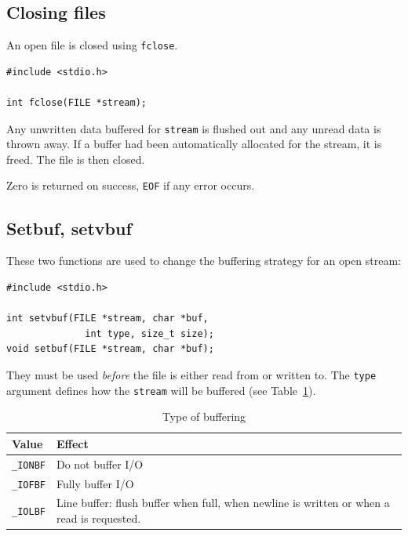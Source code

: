   

  \subsection{Closing files}
   

   An open file is closed using \texttt{fclose}.


   \begin{Verbatim}
#include <stdio.h>

int fclose(FILE *stream);
\end{Verbatim}

   Any unwritten data buffered for \texttt{stream} is  flushed  out  and
    any  unread  data  is  thrown  away.   If  a buffer had been
    automatically allocated for the stream, it  is  freed.   The
    file is then closed.


   Zero is returned on success, \texttt{EOF} if any error occurs.


  

  \subsection{Setbuf, setvbuf}
   

   These two functions are used to change the buffering strategy for an open
    stream:


   \begin{Verbatim}
#include <stdio.h>

int setvbuf(FILE *stream, char *buf,
              int type, size_t size);
void setbuf(FILE *stream, char *buf);
\end{Verbatim}

   They must be used \textit{before} the file is  either  read  from  or
    written  to.   The \texttt{type} argument defines how the
    \texttt{stream} will be buffered (see Table~\ref{tab:bufType}).


    \begin{table}[htb]
      \centering
      \begin{tabular}{lp{}}
        \toprule
        Value & Effect    \\
        \midrule
        \texttt{\_IONBF} & Do not buffer I/O    \\
        \texttt{\_IOFBF} & Fully buffer I/O    \\
        \texttt{\_IOLBF} & Line buffer: flush  buffer  when  full,
                           when  newline  is written
                           or when a read is requested.    \\
        \bottomrule
      \end{tabular}
      \caption{\label{tab:bufType}Type of buffering}
    \end{table}


